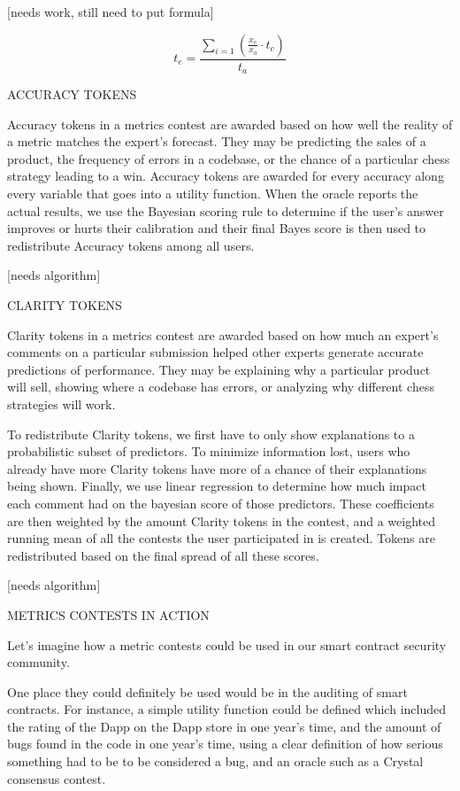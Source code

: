 {[}needs work, still need to put formula{]}

\[t_{e} = \frac{\sum_{i = 1}^{}(\frac{x_{e}}{x_{a}} \cdot t_{c})}{t_{a}}\]

ACCURACY TOKENS

Accuracy tokens in a metrics contest are awarded based on how well the
reality of a metric matches the expert's forecast. They may be
predicting the sales of a product, the frequency of errors in a
codebase, or the chance of a particular chess strategy leading to a win.
Accuracy tokens are awarded for every accuracy along every variable that
goes into a utility function. When the oracle reports the actual
results, we use the Bayesian scoring rule to determine if the user's
answer improves or hurts their calibration and their final Bayes score
is then used to redistribute Accuracy tokens among all users.

{[}needs algorithm{]}

CLARITY TOKENS

Clarity tokens in a metrics contest are awarded based on how much an
expert's comments on a particular submission helped other experts
generate accurate predictions of performance. They may be explaining why
a particular product will sell, showing where a codebase has errors, or
analyzing why different chess strategies will work.

To redistribute Clarity tokens, we first have to only show explanations
to a probabilistic subset of predictors. To minimize information lost,
users who already have more Clarity tokens have more of a chance of
their explanations being shown. Finally, we use linear regression to
determine how much impact each comment had on the bayesian score of
those predictors. These coefficients are then weighted by the amount
Clarity tokens in the contest, and a weighted running mean of all the
contests the user participated in is created. Tokens are redistributed
based on the final spread of all these scores.

{[}needs algorithm{]}

METRICS CONTESTS IN ACTION

Let's imagine how a metric contests could be used in our smart contract
security community.

One place they could definitely be used would be in the auditing of
smart contracts. For instance, a simple utility function could be
defined which included the rating of the Dapp on the Dapp store in one
year's time, and the amount of bugs found in the code in one year's
time, using a clear definition of how serious something had to be to be
considered a bug, and an oracle such as a Crystal consensus contest.

